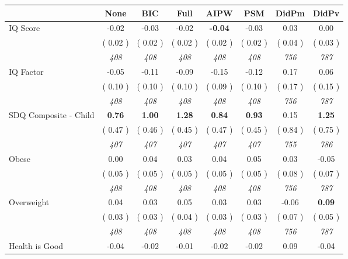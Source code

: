 \begin{tabular}{l c c c c c c c}
\toprule
 & None & BIC & Full & AIPW & PSM & DidPm & DidPv \\
\midrule
IQ Score &     -0.02 &     -0.03 &     -0.02 & \textbf{    -0.04} &     -0.03 &      0.03 &      0.00 \\
& (     0.02 ) & (     0.02 ) & (     0.02 ) & (     0.02 ) & (     0.02 ) & (     0.04 ) & (     0.03 ) \\
& \textit{ 408 } & \textit{ 408 } & \textit{ 408 } & \textit{ 408 } & \textit{ 408 } & \textit{ 756 } & \textit{ 787 } \\
IQ Factor &     -0.05 &     -0.11 &     -0.09 &     -0.15 &     -0.12 &      0.17 &      0.06 \\
& (     0.10 ) & (     0.10 ) & (     0.10 ) & (     0.09 ) & (     0.10 ) & (     0.17 ) & (     0.15 ) \\
& \textit{ 408 } & \textit{ 408 } & \textit{ 408 } & \textit{ 408 } & \textit{ 408 } & \textit{ 756 } & \textit{ 787 } \\
SDQ Composite - Child & \textbf{      0.76 } & \textbf{      1.00 } & \textbf{      1.28 } & \textbf{     0.84} & \textbf{     0.93} &      0.15 & \textbf{      1.25 } \\
& (     0.47 ) & (     0.46 ) & (     0.45 ) & (     0.47 ) & (     0.45 ) & (     0.84 ) & (     0.75 ) \\
& \textit{ 407 } & \textit{ 407 } & \textit{ 407 } & \textit{ 407 } & \textit{ 407 } & \textit{ 755 } & \textit{ 786 } \\
Obese &      0.00 &      0.04 &      0.03 &      0.04 &      0.05 &      0.03 &     -0.05 \\
& (     0.05 ) & (     0.05 ) & (     0.05 ) & (     0.05 ) & (     0.05 ) & (     0.08 ) & (     0.07 ) \\
& \textit{ 408 } & \textit{ 408 } & \textit{ 408 } & \textit{ 408 } & \textit{ 408 } & \textit{ 756 } & \textit{ 787 } \\
Overweight &      0.04 &      0.03 &      0.05 &      0.03 &      0.03 &     -0.06 & \textbf{      0.09 } \\
& (     0.03 ) & (     0.03 ) & (     0.04 ) & (     0.03 ) & (     0.03 ) & (     0.07 ) & (     0.05 ) \\
& \textit{ 408 } & \textit{ 408 } & \textit{ 408 } & \textit{ 408 } & \textit{ 408 } & \textit{ 756 } & \textit{ 787 } \\
Health is Good &     -0.04 &     -0.02 &     -0.01 &     -0.02 &     -0.02 &      0.09 &     -0.04 \\

\end{tabular}
